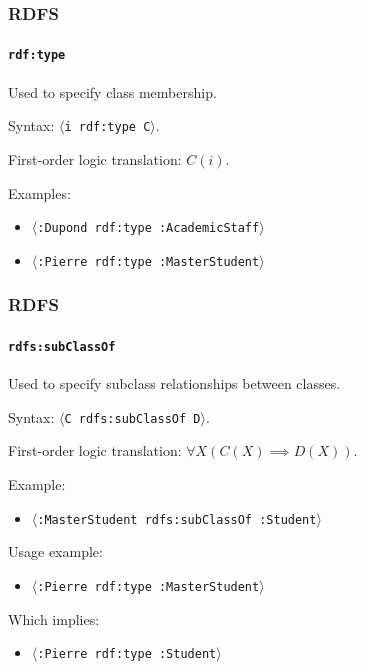 \documentclass{beamer}
\newcommand{\triple}[1]{$\langle$\texttt{#1}$\rangle$}
\begin{document}
\begin{frame}
  \frametitle{RDFS}
  \framesubtitle{\texttt{rdf:type}}

  Used to specify class membership.

  \pause

  \bigskip

  Syntax: \triple{i rdf:type C}.

  \pause

  \medskip

  First-order logic translation: $C(i)$.

  \pause

  \bigskip

  Examples:

  \begin{itemize}
    \item \triple{:Dupond rdf:type :AcademicStaff}
    \item \triple{:Pierre rdf:type :MasterStudent}
  \end{itemize}
\end{frame}

\begin{frame}
  \frametitle{RDFS}
  \framesubtitle{\texttt{rdfs:subClassOf}}

  Used to specify subclass relationships between classes.

  \pause

  \bigskip

  Syntax: \triple{C rdfs:subClassOf D}.

  \pause

  \medskip

  First-order logic translation: $\forall X (C(X) \implies D(X))$.

  \pause

  \bigskip

  Example:

  \begin{itemize}
    \item \triple{:MasterStudent rdfs:subClassOf :Student}
  \end{itemize}

  \pause

  Usage example:

  \begin{itemize}
    \item \triple{:Pierre rdf:type :MasterStudent}
  \end{itemize}

  \pause

  Which implies:

  \begin{itemize}
    \item \triple{:Pierre rdf:type :Student}
  \end{itemize}
\end{frame}
\end{document}
